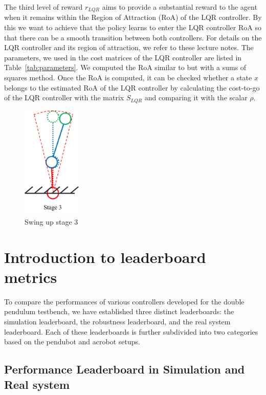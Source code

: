 The third level of reward $r_{LQR}$ aims to provide a substantial reward to the
agent when it remains within the Region of Attraction (RoA) of the LQR
controller. By this we want to achieve that the policy learns to enter the LQR
controller RoA so that there can be a smooth transition between both
controllers. For details on the LQR controller and its region of attraction, we
refer to these lecture notes. The parameters, we used in
the cost matrices of the LQR controller are listed in
Table~\ref{tab:parameters}. We computed the RoA similar to
but with a sums of squares method.  Once the RoA is computed,
it can be checked whether a state $x$ belongs to the estimated RoA of the LQR
controller by calculating the cost-to-go of the LQR controller with the matrix
$S_{LQR}$ and comparing it with the scalar $\rho$.

\begin{figure}[H]
    \centering
    \includegraphics[width=0.25\textwidth]{figures/methodology/stage3.png} %
    \caption{Swing up stage 3}
    \label{fig:my_image_label} %
\end{figure}


\section{Introduction to leaderboard metrics}
To compare the performances of various controllers developed for the double pendulum testbench, we have established three distinct leaderboards: the simulation leaderboard, the robustness leaderboard, and the real system leaderboard. Each of these leaderboards is further subdivided into two categories based on the pendubot and acrobot setups.

\subsection{Performance Leaderboard in Simulation and Real system}

